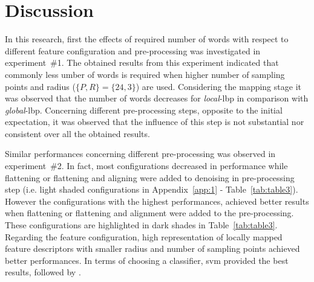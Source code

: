 \section{Discussion}
\label{sec:dis}

In this research, first the effects of required number of words with respect to different feature configuration and pre-processing was investigated in experiment~\#1.
The obtained results from this experiment indicated that commonly less umber of words is required when higher number of sampling points and radius ($\{P,R\} = \{24,3\}$) are used.
Considering the mapping stage it was observed that the number of words decreases for \emph{local}-\ac{lbp} in comparison with \emph{global}-\ac{lbp}.
Concerning different pre-processing steps, opposite to the initial expectation, it was observed that the influence of this step is not substantial nor consistent over all the obtained results.

Similar performances concerning different pre-processing was observed in experiment~\#2.
In fact, most configurations decreased in performance while flattening or flattening and aligning were added to denoising in pre-processing step (i.e. light shaded configurations in Appendix~\ref{app:1} - Table~\ref{tab:table3}).
However the configurations with the highest performances, achieved better results when flattening or flattening and alignment were added to the pre-processing.
These configurations are highlighted in dark shades in Table~\ref{tab:table3}.
Regarding the feature configuration, high representation of locally mapped feature descriptors with smaller radius and number of sampling points achieved better performances.
In terms of choosing a classifier, \ac{svm} provided the best results, followed by \rf. 

